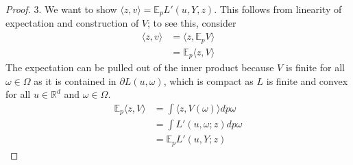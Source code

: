 \documentclass{article}
\newcommand{\reals}{\mathbb{R}}
\newcommand{\E}{\mathbb{E}}
\newcommand{\inprod}[2]{\langle #1, #2 \rangle}%
\begin{document}
\begin{proof}
3.
We want to show $\inprod{z}{v} = \E_p L'(u,Y,z)$.
This follows from linearity of expectation and construction of $V$; to see this, consider
\begin{align*}
\inprod{z}{v} &= \inprod{z}{\E_p V} \\
 &= \E_p \inprod{z}{V}
 \end{align*}
 The expectation can be pulled out of the inner product because $V$ is finite for all $\omega \in \Omega$ as it is contained in $\partial L(u,\omega)$, which is compact as $L$ is finite and convex for all $u \in \reals^d$ and $\omega \in \Omega$.
 \begin{align*}
 \E_p \inprod{z}{V} &= \int \inprod{z}{V(\omega)} dp\omega \\
 &= \int L'(u,\omega; z) dp\omega \\
 &= \E_p L'(u,Y;z)
\end{align*}



\iffalse
	Suppose we are given $z\in \reals^d$.
	We have $\E_p \partial L(u,Y)$ compact (by convexity of $L$).
	Additionally, we know for all $\omega \in \Omega$, $\sup_{x \in \partial L'(u,\omega,z)} \inprod{x}{z} := \delta_{\partial L(u,\omega)}(z)$ is attained, and for any $v \in \delta_{\partial L(u,\omega)}(z)$, we particularly have $v \in \partial L'(u,\omega, z)$.
	
	
	
	\begin{itemize}
		\item $v \in \E_p \partial L(u,Y)$
		\item $\inprod{z}{v'} = \E_p L'(u,Y,z)$.
	\end{itemize}
\fi	
	 
\end{proof}
\end{document}

